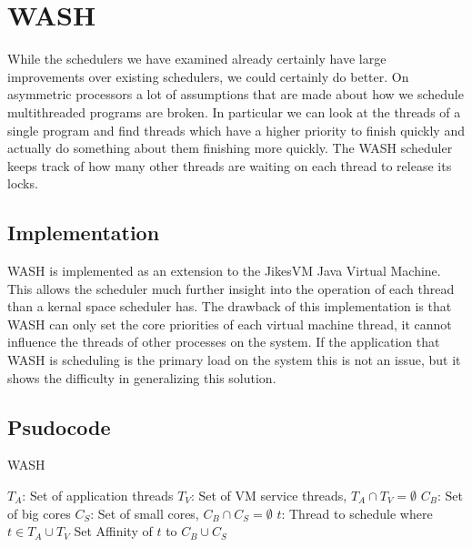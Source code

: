 \section{WASH}
While the schedulers we have examined already certainly have large improvements over existing schedulers, we could certainly do better.
On asymmetric processors a lot of assumptions that are made about how we schedule multithreaded programs are broken.
In particular we can look at the threads of a single program and find threads which have a higher priority to finish quickly and actually do something about them finishing more quickly.
The WASH scheduler keeps track of how many other threads are waiting on each thread to release its locks.

\subsection{Implementation}
WASH is implemented as an extension to the JikesVM Java Virtual Machine.
This allows the scheduler much further insight into the operation of each thread than a kernal space scheduler has.
The drawback of this implementation is that WASH can only set the core priorities of each virtual machine thread, it cannot influence the threads of other processes on the system.
If the application that WASH is scheduling is the primary load on the system this is not an issue, but it shows the difficulty in generalizing this solution.

\subsection{Psudocode}

\begin{algorithm}[H]
\caption{WASH}\label{euclid}
\begin{algorithmic}
		\State $T_A$: Set of application threads
		\State $T_V$: Set of VM service threads, $T_A \cap T_V = \emptyset$
		\State $C_B$: Set of big cores
		\State $C_S$: Set of small cores, $C_B \cap C_S = \emptyset$
		\State $t$: Thread to schedule where $t \in T_A \cup T_V$
			\EndIf
				\State Set Affinity of $t$ to $C_B \cup C_S$
			\EndIf
		\EndIf
	\EndFunction
\end{algorithmic}
\end{algorithm}